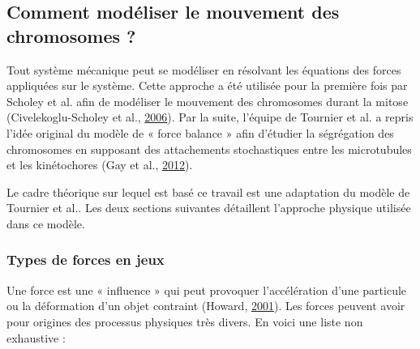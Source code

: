 \documentclass[12pt,a4paper,twoside,openright]{book}
\begin{document}
\subsection{Comment modéliser le mouvement des chromosomes
?}\label{comment-moduxe9liser-le-mouvement-des-chromosomes}

Tout système mécanique peut se modéliser en résolvant les équations des
forces appliquées sur le système. Cette approche a été utilisée pour la
première fois par Scholey et al. afin de modéliser le mouvement des
chromosomes durant la mitose (Civelekoglu-Scholey et al.,
\hyperref[ref-Civelekoglu-Scholey2006]{2006}). Par la suite, l'équipe de
Tournier et al. a repris l'idée original du modèle de « force balance »
afin d'étudier la ségrégation des chromosomes en supposant des
attachements stochastiques entre les microtubules et les kinétochores
(Gay et al., \hyperref[ref-Gay2012a]{2012}).

Le cadre théorique sur lequel est basé ce travail est une adaptation du
modèle de Tournier et al.. Les deux sections suivantes détaillent
l'approche physique utilisée dans ce modèle.

\subsubsection{Types de forces en jeux}\label{types-de-forces-en-jeux}

Une force est une « influence » qui peut provoquer l'accélération d'une
particule ou la déformation d'un objet contraint (Howard,
\hyperref[ref-Howard2001]{2001}). Les forces peuvent avoir pour origines
des processus physiques très divers. En voici une liste non exhaustive :
\end{document}
